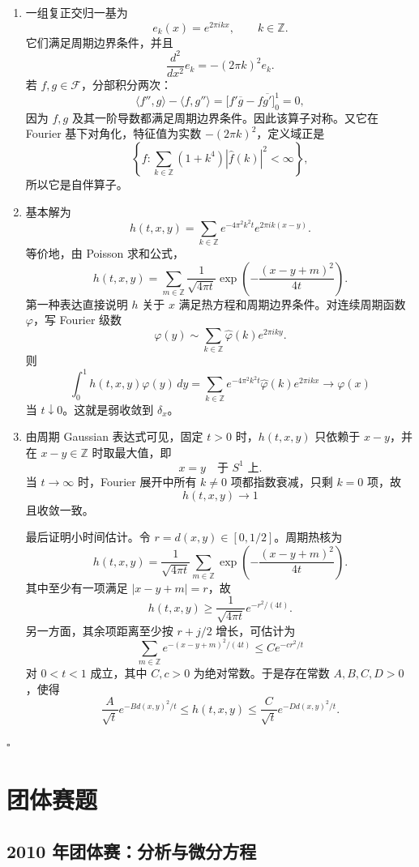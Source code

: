 \documentclass[UTF8,12pt]{ctexart}
\newcommand{\Z}{\mathbb Z}
\newenvironment{solution}{%
  \par\medskip
  \noindent{\bfseries 解答}\quad\ignorespaces
}{\hfill$\square$\par\medskip}
\begin{document}
\begin{solution}
\begin{enumerate}[label=(\arabic*)]
\item 一组复正交归一基为
\[
e_k(x)=e^{2\pi ikx},\qquad k\in\Z.
\]
它们满足周期边界条件，并且
\[
\frac{d^2}{dx^2}e_k=-(2\pi k)^2e_k.
\]
若 \(f,g\in\mathcal F\)，分部积分两次：
\[
\langle f'',g\rangle-\langle f,g''\rangle
=\bigl[f'\overline g-f\overline{g'}\bigr]_{0}^{1}=0,
\]
因为 \(f,g\) 及其一阶导数都满足周期边界条件。因此该算子对称。又它在 Fourier 基下对角化，特征值为实数 \(-(2\pi k)^2\)，定义域正是
\[
\left\{f:\sum_{k\in\Z}(1+k^4)|\widehat f(k)|^2<\infty\right\},
\]
所以它是自伴算子。

\item 基本解为
\[
h(t,x,y)=\sum_{k\in\Z}e^{-4\pi^2k^2t}e^{2\pi ik(x-y)}.
\]
等价地，由 Poisson 求和公式，
\[
h(t,x,y)=\sum_{m\in\Z}\frac1{\sqrt{4\pi t}}
\exp\left(-\frac{(x-y+m)^2}{4t}\right).
\]
第一种表达直接说明 \(h\) 关于 \(x\) 满足热方程和周期边界条件。对连续周期函数 \(\varphi\)，写 Fourier 级数
\[
\varphi(y)\sim\sum_{k\in\Z}\widehat\varphi(k)e^{2\pi iky}.
\]
则
\[
\int_0^1h(t,x,y)\varphi(y)\,dy
=\sum_{k\in\Z}e^{-4\pi^2k^2t}\widehat\varphi(k)e^{2\pi ikx}
\to \varphi(x)
\]
当 \(t\downarrow0\)。这就是弱收敛到 \(\delta_x\)。

\item 由周期 Gaussian 表达式可见，固定 \(t>0\) 时，\(h(t,x,y)\) 只依赖于 \(x-y\)，并在 \(x-y\in\Z\) 时取最大值，即
\[
x=y\quad \text{于 }S^1\text{ 上}.
\]
当 \(t\to\infty\) 时，Fourier 展开中所有 \(k\ne0\) 项都指数衰减，只剩 \(k=0\) 项，故
\[
h(t,x,y)\to1
\]
且收敛一致。

最后证明小时间估计。令 \(r=d(x,y)\in[0,1/2]\)。周期热核为
\[
h(t,x,y)=\frac1{\sqrt{4\pi t}}
\sum_{m\in\Z}\exp\left(-\frac{(x-y+m)^2}{4t}\right).
\]
其中至少有一项满足 \(|x-y+m|=r\)，故
\[
h(t,x,y)\ge \frac1{\sqrt{4\pi t}}e^{-r^2/(4t)}.
\]
另一方面，其余项距离至少按 \(r+j/2\) 增长，可估计为
\[
\sum_{m\in\Z}e^{-(x-y+m)^2/(4t)}
\le C e^{-c r^2/t}
\]
对 \(0<t<1\) 成立，其中 \(C,c>0\) 为绝对常数。于是存在常数 \(A,B,C,D>0\)，使得
\[
\frac{A}{\sqrt t}e^{-B d(x,y)^2/t}
\le h(t,x,y)\le
\frac{C}{\sqrt t}e^{-D d(x,y)^2/t}.
\]
\end{enumerate}
\end{solution}

\section{团体赛题}

\subsection{2010 年团体赛：分析与微分方程}
\end{document}
